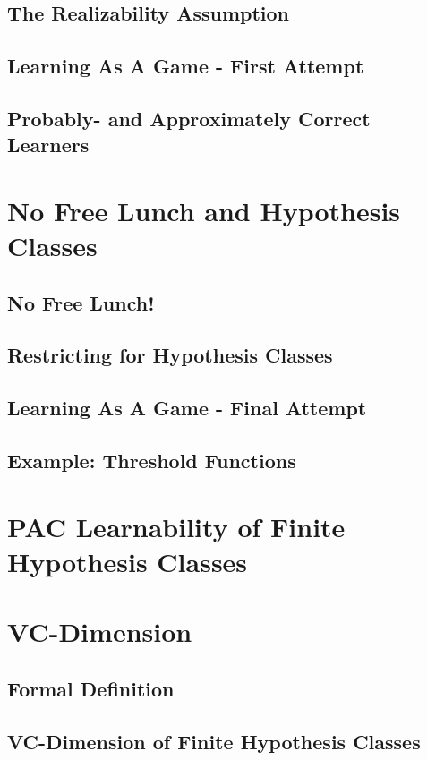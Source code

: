 \documentclass[11pt,fleqn]{book} %
\begin{document}
        \subsection{The Realizability Assumption}
        \subsection{Learning As A Game - First Attempt}
        \subsection{Probably- and Approximately Correct Learners}
    \section{No Free Lunch and Hypothesis Classes}
        \subsection{No Free Lunch!}
        \subsection{Restricting for Hypothesis Classes}
        \subsection{Learning As A Game - Final Attempt}
        \subsection{Example: Threshold Functions}
    
    \section{PAC Learnability of Finite Hypothesis Classes}
    
    \section{VC-Dimension}
        \subsection{Formal Definition}
        \subsection{VC-Dimension of Finite Hypothesis Classes}
\end{document}
